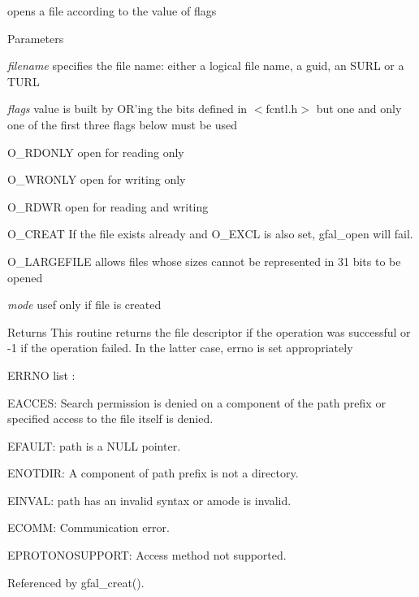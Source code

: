 opens a file according to the value of flags 


\begin{DoxyParams}{Parameters}
\item[{\em filename}]specifies the file name: either a logical file name, a guid, an SURL or a TURL \item[{\em flags}]value is built by OR’ing the bits defined in $<$fcntl.h$>$ but one and only one of the first three flags below must be used
\begin{DoxyItemize}
\item O\_\-RDONLY open for reading only
\begin{DoxyItemize}
\item O\_\-WRONLY open for writing only
\end{DoxyItemize}
\item O\_\-RDWR open for reading and writing
\begin{DoxyItemize}
\item O\_\-CREAT If the file exists already and O\_\-EXCL is also set, gfal\_\-open will fail.
\item O\_\-LARGEFILE allows files whose sizes cannot be represented in 31 bits to be opened 
\end{DoxyItemize}
\end{DoxyItemize}\item[{\em mode}]usef only if file is created \end{DoxyParams}
\begin{DoxyReturn}{Returns}
This routine returns the file descriptor if the operation was successful or -\/1 if the operation failed. In the latter case, errno is set appropriately
\begin{DoxyItemize}
\item ERRNO list : \par

\begin{DoxyItemize}
\item EACCES: Search permission is denied on a component of the path prefix or specified access to the file itself is denied.
\item EFAULT: path is a NULL pointer.
\item ENOTDIR: A component of path prefix is not a directory.
\item EINVAL: path has an invalid syntax or amode is invalid.
\item ECOMM: Communication error.
\item EPROTONOSUPPORT: Access method not supported. 
\end{DoxyItemize}
\end{DoxyItemize}
\end{DoxyReturn}


Referenced by gfal\_\-creat().

